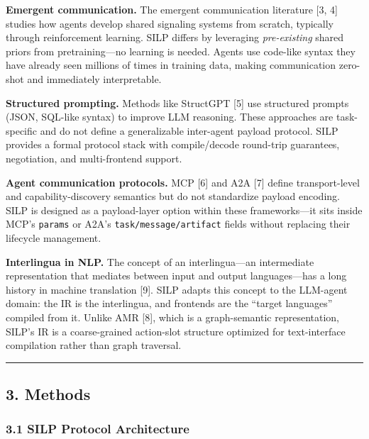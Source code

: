 \textbf{Emergent communication.} The emergent communication literature {[}3, 4{]} studies how agents develop shared signaling systems from scratch, typically through reinforcement learning. SILP differs by leveraging \emph{pre-existing} shared priors from pretraining---no learning is needed. Agents use code-like syntax they have already seen millions of times in training data, making communication zero-shot and immediately interpretable.



\textbf{Structured prompting.} Methods like StructGPT {[}5{]} use structured prompts (JSON, SQL-like syntax) to improve LLM reasoning. These approaches are task-specific and do not define a generalizable inter-agent payload protocol. SILP provides a formal protocol stack with compile/decode round-trip guarantees, negotiation, and multi-frontend support.



\textbf{Agent communication protocols.} MCP {[}6{]} and A2A {[}7{]} define transport-level and capability-discovery semantics but do not standardize payload encoding. SILP is designed as a payload-layer option within these frameworks---it sits inside MCP's \texttt{params} or A2A's \texttt{task/message/artifact} fields without replacing their lifecycle management.



\textbf{Interlingua in NLP.} The concept of an interlingua---an intermediate representation that mediates between input and output languages---has a long history in machine translation {[}9{]}. SILP adapts this concept to the LLM-agent domain: the IR is the interlingua, and frontends are the ``target languages'' compiled from it. Unlike AMR {[}8{]}, which is a graph-semantic representation, SILP's IR is a coarse-grained action-slot structure optimized for text-interface compilation rather than graph traversal.



\begin{center}\rule{0.5\linewidth}{0.5pt}\end{center}



\subsection{3. Methods}\label{methods}



\subsubsection{3.1 SILP Protocol Architecture}\label{silp-protocol-architecture}



